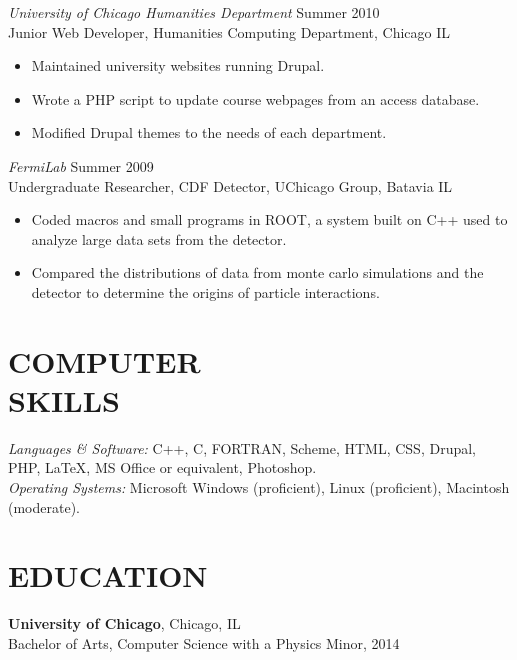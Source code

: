 \documentclass[line,margin]{res}
\begin{document}
\begin{resume}
  {\sl University of Chicago Humanities Department}
  \hfill Summer 2010 \\
  Junior Web Developer, Humanities Computing Department,
  Chicago IL
  \begin{itemize}  \itemsep-2pt
  \item Maintained university websites running Drupal.
  \item Wrote a PHP script to update course webpages from an access database.
  \item Modified Drupal themes to the needs of each department.
  \end{itemize}

  
  {\sl FermiLab} \hfill Summer 2009 \\
  Undergraduate Researcher, CDF Detector, UChicago Group, Batavia IL
  \begin{itemize}  \itemsep-2pt
  \item Coded macros and small programs in ROOT, a system built on C++ used to analyze large data sets from the detector.
  \item Compared the distributions of data from monte carlo simulations and the detector to determine the origins of particle interactions.
  \end{itemize}
  
  \section{COMPUTER \\ SKILLS} {\sl Languages \& Software:}
  C++, C, FORTRAN, Scheme, HTML, CSS, Drupal, PHP, \LaTeX, MS Office or equivalent,
  Photoshop. \\
  {\sl Operating Systems:} Microsoft Windows
  (proficient), Linux (proficient), Macintosh (moderate).
  
  
  \section{EDUCATION} {\bf University of Chicago}, Chicago, IL \\
  Bachelor of Arts, Computer Science with a Physics Minor, 2014\\

  
  
\end{resume}
\end{document}
